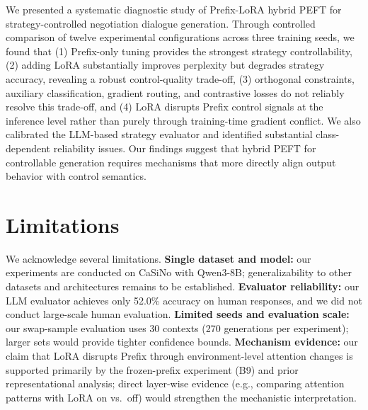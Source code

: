 \documentclass[conference]{IEEEtran}
\begin{document}
We presented a systematic diagnostic study of Prefix-LoRA hybrid PEFT for strategy-controlled negotiation dialogue generation. Through controlled comparison of twelve experimental configurations across three training seeds, we found that (1) Prefix-only tuning provides the strongest strategy controllability, (2) adding LoRA substantially improves perplexity but degrades strategy accuracy, revealing a robust control-quality trade-off, (3) orthogonal constraints, auxiliary classification, gradient routing, and contrastive losses do not reliably resolve this trade-off, and (4) LoRA disrupts Prefix control signals at the inference level rather than purely through training-time gradient conflict. We also calibrated the LLM-based strategy evaluator and identified substantial class-dependent reliability issues. Our findings suggest that hybrid PEFT for controllable generation requires mechanisms that more directly align output behavior with control semantics.

\section*{Limitations}

We acknowledge several limitations. \textbf{Single dataset and model:} our experiments are conducted on CaSiNo with Qwen3-8B; generalizability to other datasets and architectures remains to be established. \textbf{Evaluator reliability:} our LLM evaluator achieves only 52.0\% accuracy on human responses, and we did not conduct large-scale human evaluation. \textbf{Limited seeds and evaluation scale:} our swap-sample evaluation uses 30 contexts (270 generations per experiment); larger sets would provide tighter confidence bounds. \textbf{Mechanism evidence:} our claim that LoRA disrupts Prefix through environment-level attention changes is supported primarily by the frozen-prefix experiment (B9) and prior representational analysis; direct layer-wise evidence (e.g., comparing attention patterns with LoRA on vs.\ off) would strengthen the mechanistic interpretation.

\end{document}

